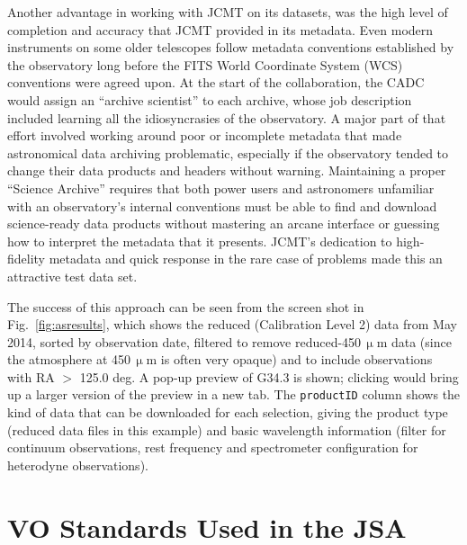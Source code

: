 \documentclass[final,authoryear,5p,times,twocolumn]{elsarticle}
\begin{document}
Another advantage in working with JCMT on its datasets, was the high
level of completion and accuracy that JCMT provided in its
metadata. Even modern instruments on some older telescopes follow
metadata conventions established by the observatory long before the FITS
World Coordinate System (WCS) conventions were agreed upon.  At the
start of the collaboration, the CADC would assign an ``archive scientist'' to
each archive, whose job description included learning all the idiosyncrasies
of the observatory.   A major part of that effort
involved working around poor or incomplete metadata that made
astronomical data archiving problematic, especially if the observatory tended to
change their data products and headers without warning.  Maintaining a
proper ``Science Archive'' requires that both power users and
astronomers unfamiliar with an observatory's
internal conventions must be able to find and download science-ready data products
without mastering an arcane interface or guessing how to interpret the
metadata that it presents.
JCMT's dedication to high-fidelity
metadata and quick response in the rare case of problems made this an
attractive test data set.

The success of
this approach can be seen from the screen shot in Fig.~\ref{fig:asresults},
which shows the reduced (Calibration Level 2) data from May 2014, sorted by
observation date, filtered to remove reduced-450\,$\upmu$m data (since the atmosphere
at 450\,$\upmu$m is often very opaque) and to include observations with RA $>$ 125.0 deg.
A pop-up preview of G34.3 is shown; clicking would bring up a larger version
of the preview in a new tab.  The \texttt{productID} column shows the kind of data that
can be downloaded for each selection, giving the product type (reduced data files in
this example) and basic wavelength information (filter for continuum observations,
rest frequency and spectrometer configuration for heterodyne observations).

\section{VO Standards Used in the JSA}
\end{document}
